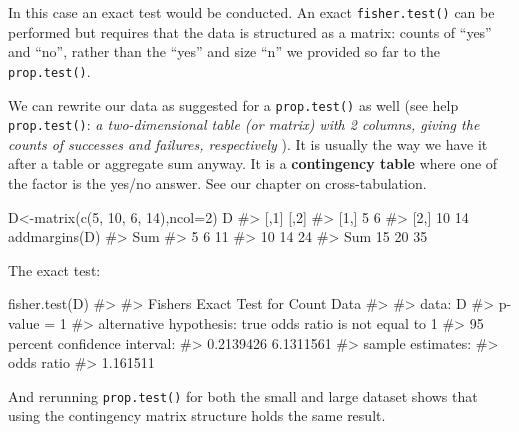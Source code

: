 \documentclass[
  letterpaper,
  DIV=11,
  numbers=noendperiod]{scrreprt}
\newenvironment{Shaded}{\begin{snugshade}}{\end{snugshade}}
\newcommand{\AttributeTok}[1]{\textcolor[rgb]{0.40,0.45,0.13}{#1}}
\newcommand{\CommentTok}[1]{\textcolor[rgb]{0.37,0.37,0.37}{#1}}
\newcommand{\DecValTok}[1]{\textcolor[rgb]{0.68,0.00,0.00}{#1}}
\newcommand{\FunctionTok}[1]{\textcolor[rgb]{0.28,0.35,0.67}{#1}}
\newcommand{\NormalTok}[1]{\textcolor[rgb]{0.00,0.23,0.31}{#1}}
\newcommand{\OtherTok}[1]{\textcolor[rgb]{0.00,0.23,0.31}{#1}}
\begin{document}
In this case an exact test would be conducted. An exact
\texttt{fisher.test()} can be performed but requires that the data is
structured as a matrix: counts of ``yes'' and ``no'', rather than the
``yes'' and size ``n'' we provided so far to the \texttt{prop.test()}.

We can rewrite our data as suggested for a \texttt{prop.test()} as well
(see help \texttt{prop.test()}: \emph{a two-dimensional table (or
matrix) with 2 columns, giving the counts of successes and failures,
respectively} ). It is usually the way we have it after a table or
aggregate sum anyway. It is a \textbf{contingency table} where one of
the factor is the yes/no answer. See our chapter on cross-tabulation.

\begin{Shaded}
\begin{Highlighting}[]
\NormalTok{D}\OtherTok{\textless{}{-}}\FunctionTok{matrix}\NormalTok{(}\FunctionTok{c}\NormalTok{(}\DecValTok{5}\NormalTok{, }\DecValTok{10}\NormalTok{, }\DecValTok{6}\NormalTok{, }\DecValTok{14}\NormalTok{),}\AttributeTok{ncol=}\DecValTok{2}\NormalTok{)}
\NormalTok{D}
\CommentTok{\#\textgreater{}      [,1] [,2]}
\CommentTok{\#\textgreater{} [1,]    5    6}
\CommentTok{\#\textgreater{} [2,]   10   14}
\FunctionTok{addmargins}\NormalTok{(D)}
\CommentTok{\#\textgreater{}           Sum}
\CommentTok{\#\textgreater{}      5  6  11}
\CommentTok{\#\textgreater{}     10 14  24}
\CommentTok{\#\textgreater{} Sum 15 20  35}
\end{Highlighting}
\end{Shaded}

The exact test:

\begin{Shaded}
\begin{Highlighting}[]
\FunctionTok{fisher.test}\NormalTok{(D)}
\CommentTok{\#\textgreater{} }
\CommentTok{\#\textgreater{}  Fisher\textquotesingle{}s Exact Test for Count Data}
\CommentTok{\#\textgreater{} }
\CommentTok{\#\textgreater{} data:  D}
\CommentTok{\#\textgreater{} p{-}value = 1}
\CommentTok{\#\textgreater{} alternative hypothesis: true odds ratio is not equal to 1}
\CommentTok{\#\textgreater{} 95 percent confidence interval:}
\CommentTok{\#\textgreater{}  0.2139426 6.1311561}
\CommentTok{\#\textgreater{} sample estimates:}
\CommentTok{\#\textgreater{} odds ratio }
\CommentTok{\#\textgreater{}   1.161511}
\end{Highlighting}
\end{Shaded}

And rerunning \texttt{prop.test()} for both the small and large dataset
shows that using the contingency matrix structure holds the same result.
\end{document}
